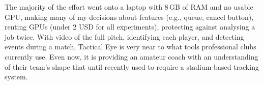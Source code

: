 The majority of the effort went onto a laptop with 8\,GB of RAM and no usable GPU, making many of my decisions about features (e.g., queue, cancel button), renting GPUs (under 2 USD for all experiments), protecting against analysing a job twice. With video of the full pitch, identifying each player, and detecting events during a match, Tactical Eye is very near to what tools professional clubs currently use. Even now, it is providing an amateur coach with an understanding of their team's shape that until recently used to require a stadium-based tracking system.
